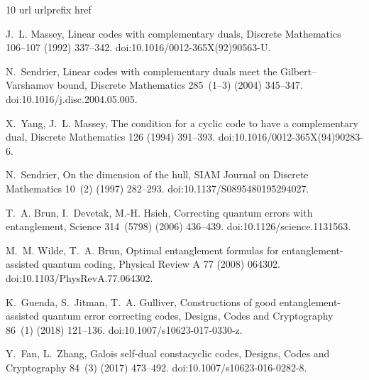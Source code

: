 \documentclass[preprint,12pt,a4paper]{elsarticle}
\theoremstyle{definition}
\theoremstyle{remark}
\begin{document}
\begin{thebibliography}{10}
\expandafter\ifx\csname url\endcsname\relax
  \def\url#1{\texttt{#1}}\fi
\expandafter\ifx\csname urlprefix\endcsname\relax\def\urlprefix{URL }\fi
\expandafter\ifx\csname href\endcsname\relax
  \def\href#1#2{#2} \def\path#1{#1}\fi

J.~L. Massey, Linear codes with complementary duals, Discrete Mathematics
  106--107 (1992) 337--342.
\newblock \href {https://doi.org/10.1016/0012-365X(92)90563-U}
  {\path{doi:10.1016/0012-365X(92)90563-U}}.

N.~Sendrier, Linear codes with complementary duals meet the
  {G}ilbert--{V}arshamov bound, Discrete Mathematics 285~(1--3) (2004)
  345--347.
\newblock \href {https://doi.org/10.1016/j.disc.2004.05.005}
  {\path{doi:10.1016/j.disc.2004.05.005}}.

X.~Yang, J.~L. Massey, The condition for a cyclic code to have a complementary
  dual, Discrete Mathematics 126 (1994) 391--393.
\newblock \href {https://doi.org/10.1016/0012-365X(94)90283-6}
  {\path{doi:10.1016/0012-365X(94)90283-6}}.

N.~Sendrier, On the dimension of the hull, SIAM Journal on Discrete Mathematics
  10~(2) (1997) 282--293.
\newblock \href {https://doi.org/10.1137/S0895480195294027}
  {\path{doi:10.1137/S0895480195294027}}.

T.~A. Brun, I.~Devetak, M.-H. Hsieh, Correcting quantum errors with
  entanglement, Science 314~(5798) (2006) 436--439.
\newblock \href {https://doi.org/10.1126/science.1131563}
  {\path{doi:10.1126/science.1131563}}.

M.~M. Wilde, T.~A. Brun, Optimal entanglement formulas for
  entanglement-assisted quantum coding, Physical Review A 77 (2008) 064302.
\newblock \href {https://doi.org/10.1103/PhysRevA.77.064302}
  {\path{doi:10.1103/PhysRevA.77.064302}}.

K.~Guenda, S.~Jitman, T.~A. Gulliver, Constructions of good
  entanglement-assisted quantum error correcting codes, Designs, Codes and
  Cryptography 86~(1) (2018) 121--136.
\newblock \href {https://doi.org/10.1007/s10623-017-0330-z}
  {\path{doi:10.1007/s10623-017-0330-z}}.

Y.~Fan, L.~Zhang, Galois self-dual constacyclic codes, Designs, Codes and
  Cryptography 84~(3) (2017) 473--492.
\newblock \href {https://doi.org/10.1007/s10623-016-0282-8}
  {\path{doi:10.1007/s10623-016-0282-8}}.


\end{thebibliography}
\end{document}
